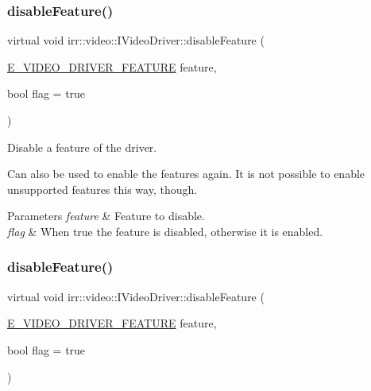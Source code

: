 \subsubsection{\texorpdfstring{disable\+Feature()}{disableFeature()}\hspace{0.1cm}{\footnotesize\ttfamily [1/2]}}
{\footnotesize\ttfamily virtual void irr\+::video\+::\+I\+Video\+Driver\+::disable\+Feature (\begin{DoxyParamCaption}\item[{\hyperlink{namespaceirr_1_1video_a57b1721e42a79c5dcf8e830e3621e08f}{E\+\_\+\+V\+I\+D\+E\+O\+\_\+\+D\+R\+I\+V\+E\+R\+\_\+\+F\+E\+A\+T\+U\+RE}}]{feature,  }\item[{bool}]{flag = {\ttfamily true} }\end{DoxyParamCaption})\hspace{0.3cm}{\ttfamily [pure virtual]}}



Disable a feature of the driver. 

Can also be used to enable the features again. It is not possible to enable unsupported features this way, though. 
\begin{DoxyParams}{Parameters}
{\em feature} & Feature to disable. \\
\hline
{\em flag} & When true the feature is disabled, otherwise it is enabled. \\
\hline
\end{DoxyParams}
\mbox{\label{classirr_1_1video_1_1IVideoDriver_aea64c03fc205f23ec7575884fb7309c8}} 
\subsubsection{\texorpdfstring{disable\+Feature()}{disableFeature()}\hspace{0.1cm}{\footnotesize\ttfamily [2/2]}}
{\footnotesize\ttfamily virtual void irr\+::video\+::\+I\+Video\+Driver\+::disable\+Feature (\begin{DoxyParamCaption}\item[{\hyperlink{namespaceirr_1_1video_a57b1721e42a79c5dcf8e830e3621e08f}{E\+\_\+\+V\+I\+D\+E\+O\+\_\+\+D\+R\+I\+V\+E\+R\+\_\+\+F\+E\+A\+T\+U\+RE}}]{feature,  }\item[{bool}]{flag = {\ttfamily true} }\end{DoxyParamCaption})\hspace{0.3cm}{\ttfamily [pure virtual]}}



